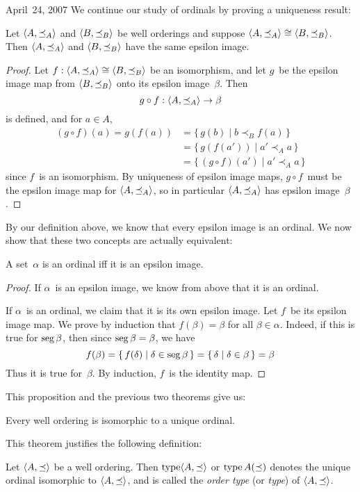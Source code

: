 \begin{lecture}{April~24, 2007}
We continue our study of ordinals by proving a uniqueness result:
\begin{thm}
Let \(\langle{A},{\preceq_A}\rangle\) and \(\langle{B},{\preceq_B}\rangle\) be well orderings and suppose \(\langle{A},{\preceq_A}\rangle\cong\langle{B},{\preceq_B}\rangle\). Then \(\langle{A},{\preceq_A}\rangle\) and \(\langle{B},{\preceq_B}\rangle\) have the same epsilon image.
\end{thm}
\begin{proof}
Let \(f:\langle{A},{\preceq_A}\rangle\cong\langle{B},{\preceq_B}\rangle\) be an isomorphism, and let \(g\)~be the epsilon image map from \(\langle{B},{\preceq_B}\rangle\) onto its epsilon image~\(\beta\). Then
\[g\circ f:\langle{A},{\preceq_A}\rangle\to\beta\]
is defined, and for \(a\in A\),
\begin{align*}
(g\circ f)(a)=g(f(a))&=\{\,g(b)\mid b\prec_B f(a)\,\}\\
	&=\{\,g(f(a'))\mid a'\prec_A a\,\}\\
	&=\{\,(g\circ f)(a')\mid a'\prec_A a\,\}
\end{align*}
since \(f\)~is an isomorphism. By uniqueness of epsilon image maps, \(g\circ f\)~must be the epsilon image map for \(\langle{A},{\preceq_A}\rangle\), so in particular \(\langle{A},{\preceq_A}\rangle\) has epsilon image~\(\beta\).
\end{proof}

By our definition above, we know that every epsilon image is an ordinal. We now show that these two concepts are actually equivalent:
\begin{prop}
A set~\(\alpha\) is an ordinal iff it is an epsilon image.
\end{prop}
\begin{proof}
If \(\alpha\)~is an epsilon image, we know from above that it is an ordinal.

If \(\alpha\)~is an ordinal, we claim that it is its own epsilon image. Let \(f\)~be its epsilon image map. We prove by induction that \(f(\beta)=\beta\) for all \(\beta\in\alpha\).  Indeed, if this is true for \(\operatorname{seg}\beta\), then since \(\operatorname{seg}\beta=\beta\), we have
\[f(\beta)=\{\,f(\delta)\mid \delta\in\operatorname{seg}\beta\,\}=\{\,\delta\mid \delta\in\beta\,\}=\beta\]
Thus it is true for~\(\beta\). By induction, \(f\)~is the identity map.
\end{proof}
This proposition and the previous two theorems give us:
\begin{thm}
Every well ordering is isomorphic to a unique ordinal.
\end{thm}
\noindent This theorem justifies the following definition:
\begin{defn}
Let \(\langle{A},{\preceq}\rangle\) be a well ordering. Then \(\operatorname{type}\langle{A},{\preceq}\rangle\) or \(\operatorname{type} A(\preceq)\) denotes the unique ordinal isomorphic to \(\langle{A},{\preceq}\rangle\), and is called the \emph{order type} (or \emph{type}) of \(\langle{A},{\preceq}\rangle\).
\end{defn}


\end{lecture}
